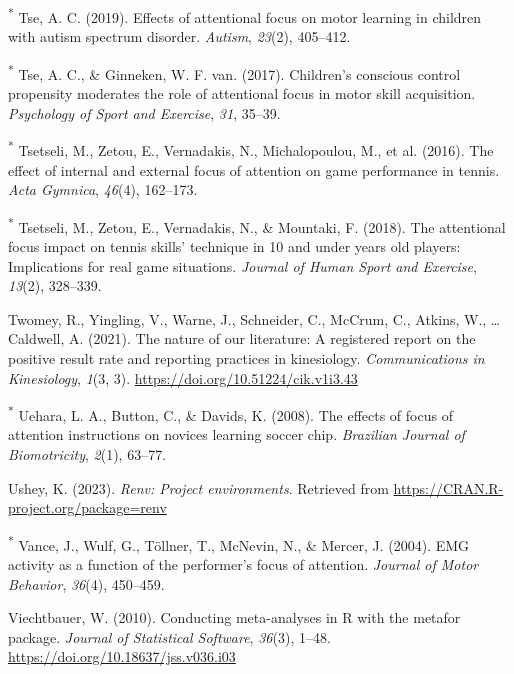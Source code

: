 \documentclass[
  man, donotrepeattitle,floatsintext]{apa7}
\newlength{\cslhangindent}
\newlength{\cslentryspacingunit} %
\newenvironment{CSLReferences}[2] %
 {%
  \setlength{\parindent}{0pt}
  \ifodd #1
  \let\oldpar\par
  \def\par{\hangindent=\cslhangindent\oldpar}
  \fi
  \setlength{\parskip}{#2\cslentryspacingunit}
 }%
 {}
\begin{document}
\begin{CSLReferences}{1}{0}
\leavevmode{}%
\textsuperscript{*} Tse, A. C. (2019). Effects of attentional focus on motor learning in children with autism spectrum disorder. \emph{Autism}, \emph{23}(2), 405--412.

\leavevmode{}%
\textsuperscript{*} Tse, A. C., \& Ginneken, W. F. van. (2017). Children's conscious control propensity moderates the role of attentional focus in motor skill acquisition. \emph{Psychology of Sport and Exercise}, \emph{31}, 35--39.

\leavevmode{}%
\textsuperscript{*} Tsetseli, M., Zetou, E., Vernadakis, N., Michalopoulou, M., et al. (2016). The effect of internal and external focus of attention on game performance in tennis. \emph{Acta Gymnica}, \emph{46}(4), 162--173.

\leavevmode{}%
\textsuperscript{*} Tsetseli, M., Zetou, E., Vernadakis, N., \& Mountaki, F. (2018). The attentional focus impact on tennis skills' technique in 10 and under years old players: Implications for real game situations. \emph{Journal of Human Sport and Exercise}, \emph{13}(2), 328--339.

\leavevmode{}%
Twomey, R., Yingling, V., Warne, J., Schneider, C., McCrum, C., Atkins, W., \ldots{} Caldwell, A. (2021). The nature of our literature: {A} registered report on the positive result rate and reporting practices in kinesiology. \emph{Communications in Kinesiology}, \emph{1}(3, 3). \url{https://doi.org/10.51224/cik.v1i3.43}

\leavevmode{}%
\textsuperscript{*} Uehara, L. A., Button, C., \& Davids, K. (2008). The effects of focus of attention instructions on novices learning soccer chip. \emph{Brazilian Journal of Biomotricity}, \emph{2}(1), 63--77.

\leavevmode{}%
Ushey, K. (2023). \emph{Renv: Project environments}. Retrieved from \url{https://CRAN.R-project.org/package=renv}

\leavevmode{}%
\textsuperscript{*} Vance, J., Wulf, G., Töllner, T., McNevin, N., \& Mercer, J. (2004). EMG activity as a function of the performer's focus of attention. \emph{Journal of Motor Behavior}, \emph{36}(4), 450--459.

\leavevmode{}%
Viechtbauer, W. (2010). Conducting meta-analyses in {R} with the {metafor} package. \emph{Journal of Statistical Software}, \emph{36}(3), 1--48. \url{https://doi.org/10.18637/jss.v036.i03}


\end{CSLReferences}
\end{document}
